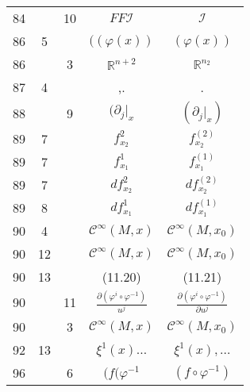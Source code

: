 \documentclass[a4paper,11pt]{article}
\newcommand{\fr}{\frac}
\newcommand{\mb}{\mathbb}
\newcommand{\mc}{\mathcal}
\newcommand{\pr}{\partial}
\newcommand{\ld}{\ldots}
\newcommand{\vp}{\varphi}
\newcommand{\R}{\mb{R}}
\newcommand{\Cc}{\mc{C}}
\newcommand{\I}{\mc{I}}
\begin{document}
\begin{center}
\begin{tabular}{|c|c|c|c|c|}
    84 & & 10 & $FF\I$ & $\I$ \\
    86 &  5 & & $( ( \vp( x ) )$ & $( \vp( x ) )$ \\
    86 & &  3 & $\R^{ n + 2 }$ & $\R^{ n_{ 2 } }$ \\
    87 &  4 & & ,. & . \\
    88 & &  9 & $( \pr_{ j }|_{ x }$ & $( \pr_{ j }|_{ x } )$ \\
    89 &  7 & & $f_{ x_{ 2 } }^{ 2 }$ & $f_{ x_{ 2 } }^{ ( 2 ) }$ \\
    89 &  7 & & $f_{ x_{ 1 } }^{ 1 }$ & $f_{ x_{ 1 } }^{ ( 1 ) }$ \\
    89 &  7 & & $d f_{ x_{ 2 } }^{ 2 }$ & $d f_{ x_{ 2 } }^{ ( 2 ) }$ \\
    89 &  8 & & $d f_{ x_{ 1 } }^{ 1 }$ & $d f_{ x_{ 1 } }^{ ( 1 ) }$ \\
    90 &  4 & & $\Cc^{ \infty }( M, x )$ & $\Cc^{ \infty }( M, x_{ 0 } )$ \\
    90 & 12 & & $\Cc^{ \infty }( M, x )$
           & $\Cc^{ \infty }( M, x_{ 0 } )$ \\
    90 & 13 & & (11.20) & (11.21) \\
    90 & & 11 & $\fr{ \pr ( \vp^{ i } \circ \vp^{ -1 } ) }{ u^{ j } }$
           & $\fr{ \pr ( \vp^{ i } \circ \vp^{ -1 } ) }{ \pr u^{ j } }$ \\
    90 & &  3 & $\Cc^{ \infty }( M, x )$
           & $\Cc^{ \infty }( M, x_{ 0 } )$ \\
    92 & 13 & & $\xi^{ 1 }(x) \ld$ & $\xi^{ 1 }(x), \ld$ \\
    96 & &  6 & $( f ( \vp^{ -1 }$ & $( f \circ \vp^{ -1 } )$ \\ 
    \hline
  \end{tabular}



\end{center}
\end{document}
